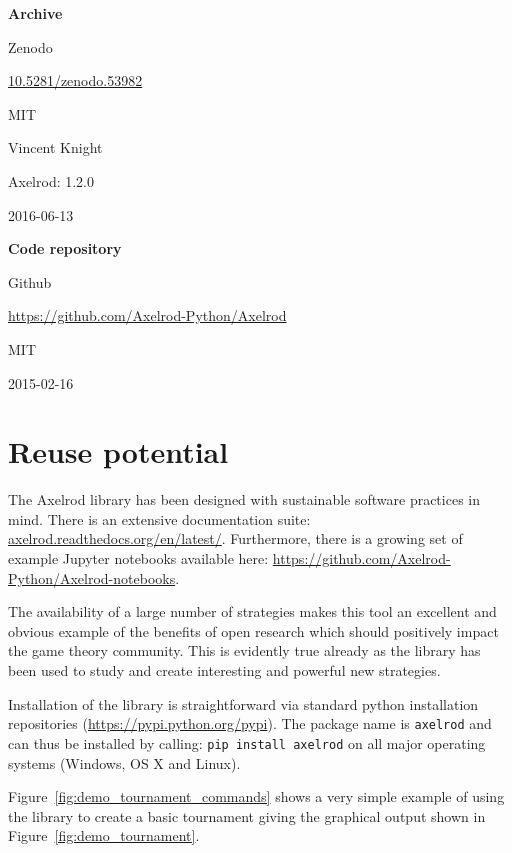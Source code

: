 \documentclass{jors}
\begin{document}
{\bf Archive}

\begin{description}[noitemsep,topsep=0pt]
    \item[Name:] Zenodo
    \item[Persistent identifier:]
\href{https://zenodo.org/record/53982}{10.5281/zenodo.53982}
    \item[Licence:] MIT
    \item[Publisher:]  Vincent Knight
    \item[Version published:] Axelrod: 1.2.0
    \item[Date published:] 2016-06-13
\end{description}

{\bf Code repository}

\begin{description}[noitemsep,topsep=0pt]
    \item[Name:] Github
    \item[Identifier:] \url{https://github.com/Axelrod-Python/Axelrod}
    \item[Licence:] MIT
    \item[Date published:] 2015-02-16
\end{description}

\section*{Reuse potential}\label{sec:reuse}

The Axelrod library has been designed with sustainable software practices in
mind. There is an extensive documentation suite:
\url{axelrod.readthedocs.org/en/latest/}. Furthermore, there is a growing set
of example Jupyter notebooks available here:
\url{https://github.com/Axelrod-Python/Axelrod-notebooks}.

The availability of a large number of strategies makes this
tool an excellent and obvious example of the benefits of open research which
should positively impact the game theory community.
This is evidently true already as the library has been used to study and create
interesting and powerful new strategies.

Installation of the library is straightforward via standard python installation
repositories (\url{https://pypi.python.org/pypi}). The package name is
\texttt{axelrod} and can thus be installed by calling: \texttt{pip install
axelrod} on all major operating systems (Windows, OS X and Linux).

Figure~\ref{fig:demo_tournament_commands} shows a very simple example of using
the library to create a basic tournament giving the graphical output shown in
Figure~\ref{fig:demo_tournament}.
\end{document}
